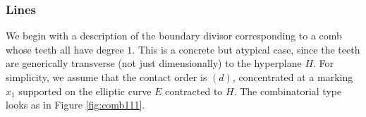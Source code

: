 \documentclass[11pt]{amsart}
\newcommand{\sqC}{\scalebox{0.8}[1.3]{$\sqsubset$}}
\newcommand{\PP}{\mathbb P}
\theoremstyle{definition}
\theoremstyle{definition}
\begin{document}
\begin{comment}

\begin{proof}[Proof of Lemma \ref{lem:corecontact}]
Consider the vertices that lie above $0\in\mathbb R_{\geq0}$ on the circle of radius $\delta$: the edges departing from them go directly (up to bubbling) to the core, since there cannot be stable vertices inside the open disc  when we have only one tropical parameter. In particular, all these edges have the same expansion factor $m$ (see again Figure \ref{fig:off_we_go}), which is maximal among those of the edges adjacent to the core. Indeed, all the edges from the core to the circle have the same length $\delta$, so the ones having maximal contact order are those that reach further from the core, and at least one must reach $0\in\mathbb R_{\geq0}$, for otherwise there would be an extra tropical parameter.

Finally, in case the maximal contact order is $m=1$, in order for $f_B$ to factor, the image of the tangent vectors at the components lying on the circle must be linearly dependent in $T_{\PP^m,x}$, where $x$ denotes the image of the core under $f_B$.in which case we can deduce as above that factorisation will be satisfied independently of the choice of alignment.
\end{proof}

For the remainder of this section we use the following notation for the combinatorial type $\Delta$; we let $\sqC_0$ denotes the vertex of dual graph corresponding to the core, $\sqC_1,\ldots,\sqC_r$ the other stable vertices (genus zero and lying on the circle, by the previous lemma) and $q_1,\ldots,q_r$ the corresponding splitting nodes.
 
\end{comment}
\subsubsection{Lines}\label{S:lines}
We begin with a description of the boundary divisor corresponding to a comb whose teeth all have degree $1$. This is a concrete but atypical case, since the teeth are generically transverse (not just dimensionally) to the hyperplane $H$. For simplicity, we assume that the contact order is $(d)$, concentrated at a marking $x_1$ supported on the elliptic curve $E$ contracted to $H$. The combinatorial type looks as in Figure \ref{fig:comb111}.
\end{document}
